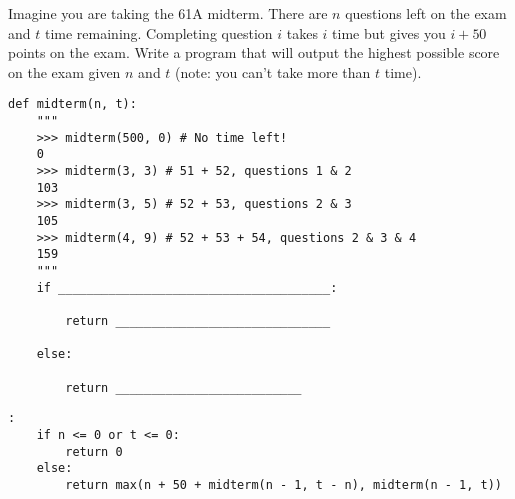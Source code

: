 \begin{blocksection}
\question Imagine you are taking the 61A midterm. There are $n$ questions left on the exam and $t$ time remaining. Completing question $i$ takes $i$ time but gives you $i + 50$ points on the exam. Write a program that will output the highest possible score on the exam given $n$ and $t$ (note: you can't take more than $t$ time). \\

\begin{lstlisting}
def midterm(n, t):
    """
    >>> midterm(500, 0) # No time left!
    0 
    >>> midterm(3, 3) # 51 + 52, questions 1 & 2
    103
    >>> midterm(3, 5) # 52 + 53, questions 2 & 3
    105 
    >>> midterm(4, 9) # 52 + 53 + 54, questions 2 & 3 & 4
    159
    """		
    if ______________________________________:		

        return ______________________________	

    else:

        return __________________________
\end{lstlisting}

\begin{solution}[1in]
\begin{lstlisting}:
    if n <= 0 or t <= 0:
        return 0
    else:
        return max(n + 50 + midterm(n - 1, t - n), midterm(n - 1, t))
\end{lstlisting}
\end{solution}
\end{blocksection}
